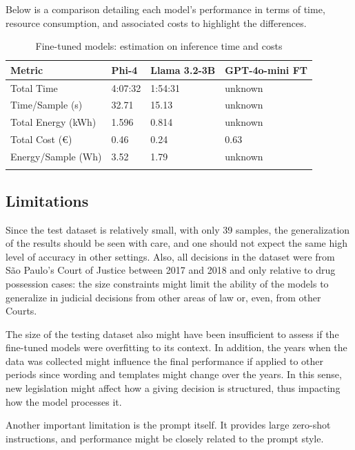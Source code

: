 \documentclass[
  12pt,
]{article}
\begin{document}
Below is a comparison detailing each model's performance in terms of
time, resource consumption, and associated costs to highlight the
differences.

\begin{longtable}[]{@{}llll@{}}

\toprule\noalign{}
Metric & Phi-4 & Llama 3.2-3B & GPT-4o-mini FT \\
\midrule\noalign{}
\endhead
\bottomrule\noalign{}
\endlastfoot
Total Time & 4:07:32 & 1:54:31 & unknown \\
Time/Sample (s) & 32.71 & 15.13 & unknown \\
Total Energy (kWh) & 1.596 & 0.814 & unknown \\
Total Cost (€) & 0.46 & 0.24 & 0.63 \\
Energy/Sample (Wh) & 3.52 & 1.79 & unknown \\


\caption{\label{tbl-inference-costs}Fine-tuned models: estimation on
inference time and costs}

\tabularnewline
\end{longtable}

\subsection{Limitations}\label{sec-limitations}

Since the test dataset is relatively small, with only 39 samples, the
generalization of the results should be seen with care, and one should
not expect the same high level of accuracy in other settings. Also, all
decisions in the dataset were from São Paulo's Court of Justice between
2017 and 2018 and only relative to drug possession cases: the size
constraints might limit the ability of the models to generalize in
judicial decisions from other areas of law or, even, from other Courts.

The size of the testing dataset also might have been insufficient to
assess if the fine-tuned models were overfitting to its context. In
addition, the years when the data was collected might influence the
final performance if applied to other periods since wording and
templates might change over the years. In this sense, new legislation
might affect how a giving decision is structured, thus impacting how the
model processes it.

Another important limitation is the prompt itself. It provides large
zero-shot instructions, and performance might be closely related to the
prompt style.
\end{document}
